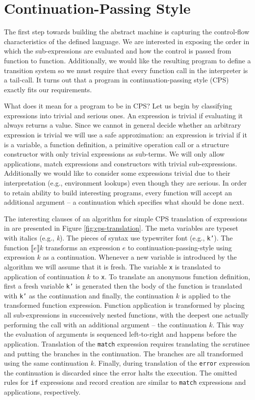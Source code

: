 \section{Continuation-Passing Style}
The first step towards building the abstract machine is capturing the control-flow characteristics of the defined language.
We are interested in exposing the order in which the sub-expressions are evaluated and how the control is passed from function to function.
Additionally, we would like the resulting program to define a transition system so we must require that every function call in the interpreter is a tail-call.
It turns out that a program in continuation-passing style (CPS) exactly fits our requirements.

What does it mean for a program to be in CPS?
Let us begin by classifying expressions into trivial and serious ones.
An expression is trivial if evaluating it always returns a value.
Since we cannot in general decide whether an arbitrary expression is trivial we will use a safe approximation: an expression is trivial if it is a variable, a function definition, a primitive operation call or a structure constructor with only trivial expressions as sub-terms.
We will only allow applications, match expressions and constructors with trivial sub-expressions.
Additionally we would like to consider some expressions trivial due to their interpretation (e.g., environment lookups) even though they are serious.
In order to retain ability to build interesting programs, every function will accept an additional argument -- a continuation which specifies what should be done next.

The interesting clauses of an algorithm for simple CPS translation of expressions in \IDL{} are presented in Figure \ref{fig:cps-translation}.
The meta variables are typeset with italics (e.g., \textit{k}).
The pieces of syntax use typewriter font (e.g., \texttt{k'}).
The function $ \llbracket e \rrbracket k $ transforms an expression $e$ to continuation-passing-style using expression $k$ as a continuation.
Whenever a new variable is introduced by the algorithm we will assume that it is fresh.
The variable \texttt{x} is translated to application of continuation $k$ to \texttt{x}.
To translate an anonymous function definition, first a fresh variable \texttt{k'} is generated then the body of the function is translated with \texttt{k'} as the continuation and finally, the continuation $k$ is applied to the transformed function expression.
Function application is transformed by placing all sub-expressions in successively nested functions, with the deepest one actually performing the call with an additional argument -- the continuation $k$.
This way the evaluation of arguments is sequenced left-to-right and happens before the application.
Translation of the \lstinline{match} expression requires translating the scrutinee and putting the branches in the continuation. The branches are all transformed using the same continuation $k$.
Finally, during translation of the \texttt{error} expression the continuation is discarded since the error halts the execution.
The omitted rules for \texttt{if} expressions and record creation are similar to \texttt{match} expressions and applications, respectively.

